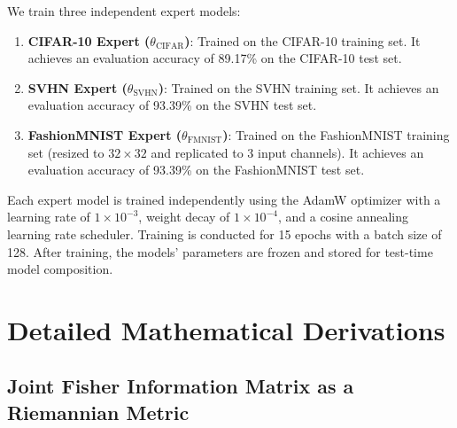 \documentclass{article}
\theoremstyle{plain}
\theoremstyle{definition}
\theoremstyle{remark}
\begin{document}
We train three independent expert models:
\begin{enumerate}
  \item \textbf{CIFAR-10 Expert ($\theta_{\text{CIFAR}}$)}: Trained on the CIFAR-10 training set. It achieves an evaluation accuracy of 89.17\% on the CIFAR-10 test set.
  \item \textbf{SVHN Expert ($\theta_{\text{SVHN}}$)}: Trained on the SVHN training set. It achieves an evaluation accuracy of 93.39\% on the SVHN test set.
  \item \textbf{FashionMNIST Expert ($\theta_{\text{FMNIST}}$)}: Trained on the FashionMNIST training set (resized to $32 \times 32$ and replicated to 3 input channels). It achieves an evaluation accuracy of 93.39\% on the FashionMNIST test set.
\end{enumerate}

Each expert model is trained independently using the AdamW optimizer with a learning rate of $1\times 10^{-3}$, weight decay of $1\times 10^{-4}$, and a cosine annealing learning rate scheduler. Training is conducted for 15 epochs with a batch size of 128. After training, the models' parameters are frozen and stored for test-time model composition.

\section{Detailed Mathematical Derivations}
\label{app:derivations}

\subsection{Joint Fisher Information Matrix as a Riemannian Metric}
\end{document}
